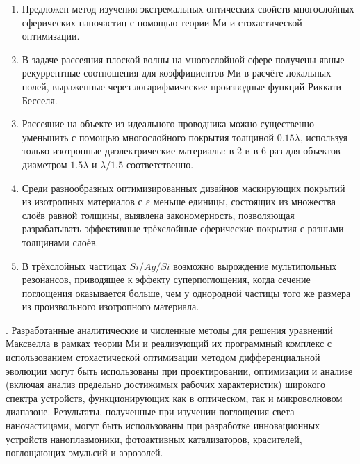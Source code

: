 {}
\begin{enumerate}
  \item Предложен метод изучения экстремальных оптических свойств
    многослойных сферических наночастиц с помощью теории Ми и
    стохастической оптимизации.
  \item В задаче рассеяния плоской волны на многослойной сфере
    получены явные рекуррентные соотношения для коэффициентов Ми в
    расчёте локальных полей, выраженные через логарифмические
    производные функций Риккати-Бесселя. %
  \item Рассеяние на объекте из идеального проводника можно
    существенно уменьшить с помощью многослойного покрытия толщиной
    $0.15\lambda$, используя только изотропные диэлектрические
    материалы: в 2 и в 6 раз для объектов диаметром $1.5\lambda$ и
    $\lambda/1.5$ соответственно.
  \item %
    Среди разнообразных оптимизированных дизайнов маскирующих покрытий из
    изотропных материалов с $\varepsilon$ меньше единицы, состоящих из
    множества слоёв равной толщины, выявлена закономерность,
    позволяющая разрабатывать эффективные трёхслойные сферические
    покрытия с разными толщинами слоёв. %


  \item В трёхслойных частицах $Si/Ag/Si$ возможно вырождение
    мультипольных резонансов, приводящее к эффекту суперпоглощения,
    когда сечение поглощения оказывается больше, чем у однородной
    частицы того же размера из произвольного изотропного материала.
\end{enumerate}


{\influence}. Разработанные аналитические и численные методы для решения
уравнений Максвелла в рамках теории Ми и реализующий их
программный комплекс с использованием стохастической оптимизации
методом дифференциальной эволюции могут быть использованы при
проектировании, оптимизации и анализе (включая анализ предельно
достижимых рабочих характеристик) широкого спектра устройств,
функционирующих как в оптическом, так и микроволновом диапазоне.
Результаты, полученные при изучении поглощения света наночастицами, могут
быть использованы при разработке инновационных устройств
наноплазмоники, фотоактивных катализаторов, красителей, поглощающих
эмульсий и аэрозолей.

